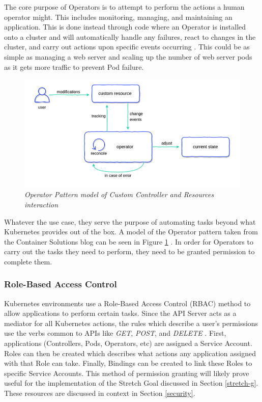 \documentclass{article}
\begin{document}
The core purpose of Operators is to attempt to perform the actions a human operator might. This includes monitoring, managing, and maintaining an application. This is done instead through code where an Operator is installed onto a cluster and will automatically handle any failures, react to changes in the cluster, and carry out actions upon specific events occurring \cite{operator-pattern}. This could be as simple as managing a web server and scaling up the number of web server pods as it gets more traffic to prevent Pod failure.
\begin{figure}[H]
    \centering
    \includegraphics[width=160mm]{tech/operator-pattern.png}
    \caption{\emph{Operator Pattern model of Custom Controller and Resources interaction}}
    \label{op-pat}
\end{figure}

Whatever the use case, they serve the purpose of automating tasks beyond what Kubernetes provides out of the box. A model of the Operator pattern taken from the Container Solutions blog can be seen in Figure \ref{op-pat} \cite{op-pat-blog}. In order for Operators to carry out the tasks they need to perform, they need to be granted permission to complete them. 



\subsubsection{Role-Based Access Control}

Kubernetes environments use a Role-Based Access Control (RBAC) method to allow applications to perform certain tasks. Since the API Server acts as a mediator for all Kubernetes actions, the rules which describe a user's permissions use the verbs common to APIs like \emph{GET}, \emph{POST}, and \emph{DELETE} \cite{rbac}. First, applications (Controllers, Pods, Operators, etc) are assigned a Service Account. Roles can then be created which describes what actions any application assigned with that Role can take. Finally, Bindings can be created to link these Roles to specific Service Accounts. This method of permission granting will likely prove useful for the implementation of the Stretch Goal discussed in Section \ref{stretch-g}. These resources are discussed in context in Section \ref{security}.
\end{document}
